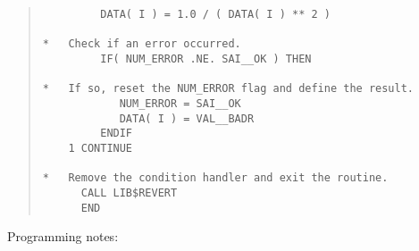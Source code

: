 \begin{quote}
\begin{tabbing}
\verb#         DATA( I ) = 1.0 / ( DATA( I ) ** 2 )     #\\
\verb#                                                  #\\
\verb#*   Check if an error occurred.                   #\\
\verb#         IF( NUM_ERROR .NE. SAI__OK ) THEN        #\\
\verb#                                                  #\\
\verb#*   If so, reset the NUM_ERROR flag and define the result.#\\
\verb#            NUM_ERROR = SAI__OK                   #\\
\verb#            DATA( I ) = VAL__BADR                 #\\
\verb#         ENDIF                                    #\\
\verb#    1 CONTINUE                                    #\\
\verb#                                                  #\\
\verb#*   Remove the condition handler and exit the routine.#\\
\verb#      CALL LIB$REVERT                             #\\
\verb#      END                                         #\\
\end{tabbing}
\end{quote}

Programming notes:

